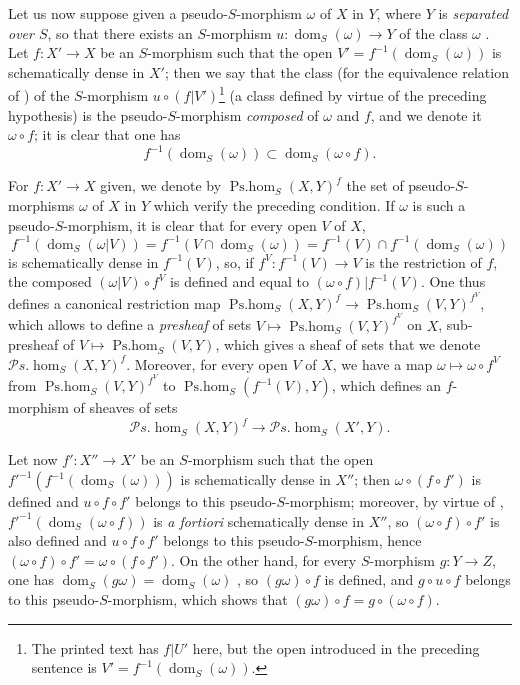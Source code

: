 \begin{env}[20.3.2]
\label{IV.20.3.2}
Let us now suppose given a pseudo-$S$-morphism $\omega$ of $X$ in $Y$, where $Y$ is \emph{separated over $S$}, so that there exists an $S$-morphism $u:\operatorname{dom}_S(\omega)\to Y$ of the class $\omega$ .
Let $f:X'\to X$ be an $S$-morphism such that the open $V'=f^{-1}(\operatorname{dom}_S(\omega))$ is schematically dense in $X'$;
then we say that the class (for the equivalence relation of ) of the $S$-morphism $u\circ(f|V')$\footnote{The printed text has $f|U'$ here, but the open introduced in the preceding sentence is $V'=f^{-1}(\operatorname{dom}_S(\omega))$.} (a class defined by virtue of the preceding hypothesis) is the pseudo-$S$-morphism \emph{composed} of $\omega$ and $f$, and we denote it $\omega\circ f$;
it is clear that one has
\[
\label{IV.20.3.2.1}
  f^{-1}(\operatorname{dom}_S(\omega))\subset\operatorname{dom}_S(\omega\circ f).
  \tag{20.3.2.1}
\]

For $f:X'\to X$ given, we denote by $\operatorname{Ps.hom}_S(X,Y)^f$ the set of pseudo-$S$-morphisms $\omega$ of $X$ in $Y$ which verify the preceding condition.
If $\omega$ is such a pseudo-$S$-morphism, it is clear that for every open $V$ of $X$,
\[
  f^{-1}(\operatorname{dom}_S(\omega|V))=f^{-1}(V\cap\operatorname{dom}_S(\omega))=f^{-1}(V)\cap f^{-1}(\operatorname{dom}_S(\omega))
\]
is schematically dense in $f^{-1}(V)$, so, if $f^V:f^{-1}(V)\to V$ is the restriction of $f$, the composed $(\omega|V)\circ f^V$ is defined and equal to $(\omega\circ f)|f^{-1}(V)$.
One thus defines a
canonical restriction map $\operatorname{Ps.hom}_S(X,Y)^f\to\operatorname{Ps.hom}_S(V,Y)^{f^V}$, which
allows to define a \emph{presheaf} of sets $V\mapsto\operatorname{Ps.hom}_S(V,Y)^{f^V}$ on $X$, sub-presheaf of $V\mapsto\operatorname{Ps.hom}_S(V,Y)$, which gives a sheaf of sets that we denote $\mathscr{P}\!s.\!\operatorname{hom}_S(X,Y)^f$.
Moreover, for every open $V$ of $X$, we have a map $\omega\mapsto\omega\circ f^V$ from $\operatorname{Ps.hom}_S(V,Y)^{f^V}$ to $\operatorname{Ps.hom}_S(f^{-1}(V),Y)$, which defines an $f$-morphism of sheaves of sets
\[
  \mathscr{P}\!s.\!\operatorname{hom}_S(X,Y)^f\to\mathscr{P}\!s.\!\operatorname{hom}_S(X',Y).
\]
\end{env}

\begin{env}[20.3.3]
\label{IV.20.3.3}
Let now $f':X''\to X'$ be an $S$-morphism such that the open $f'^{-1}(f^{-1}(\operatorname{dom}_S(\omega)))$ is schematically dense in $X''$;
then $\omega\circ(f\circ f')$ is defined and $u\circ f\circ f'$ belongs to this pseudo-$S$-morphism;
moreover, by virtue of , $f'^{-1}(\operatorname{dom}_S(\omega\circ f))$ is \emph{a fortiori} schematically dense in $X''$, so $(\omega\circ f)\circ f'$ is also defined and $u\circ f\circ f'$ belongs to this pseudo-$S$-morphism, hence $(\omega\circ f)\circ f'=\omega\circ(f\circ f')$.
On the other hand, for every $S$-morphism $g:Y\to Z$, one has $\operatorname{dom}_S(g\omega)=\operatorname{dom}_S(\omega)$ , so $(g\omega)\circ f$ is defined, and $g\circ u\circ f$ belongs to this pseudo-$S$-morphism, which shows that $(g\omega)\circ f=g\circ(\omega\circ f)$.
\end{env}


